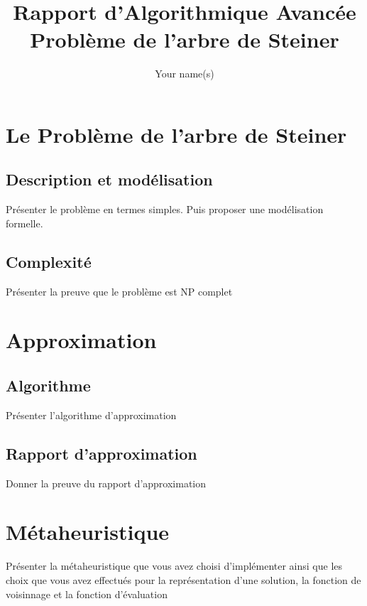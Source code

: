 \documentclass{article}
\title{Rapport d'Algorithmique Avancée \\ Problème de l'arbre de Steiner}
\author{ Your name(s) }
\begin{document}
\maketitle

\newpage



\tableofcontents

\newpage




\section{Le Problème de l'arbre de Steiner}




\subsection{Description et modélisation}

Présenter le problème en termes simples.
Puis proposer une modélisation formelle.

\subsection{Complexité}

Présenter la preuve que le problème est NP complet


\section{Approximation}

\subsection{Algorithme}
Présenter l'algorithme d'approximation

\subsection{Rapport d'approximation}
Donner la preuve du rapport d'approximation


\section{Métaheuristique}

Présenter la métaheuristique que vous avez choisi d'implémenter ainsi que les choix que vous avez effectués pour la représentation d'une solution, la fonction de voisinnage et la fonction d'évaluation
\end{document}
